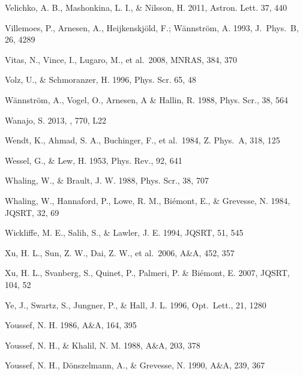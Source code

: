 \documentclass[traditabstract]{aa}
\begin{document}
\begin{thebibliography}{}
  Velichko, A. B., Mashonkina, L. I., \& Nilsson, H. 2011, Astron. Lett. 37, 440

  Villemoes, P., Arnesen, A., Heijkenskj\"old, F.; W\"annstr\"om, A. 1993, J.\ Phys.\ B, 26, 4289 

  Vitas, N., Vince, I., Lugaro, M., et al.\ 2008, MNRAS, 384, 370

  Volz, U., \& Schmoranzer, H.  1996, Phys. Scr.  65, 48

  W\"{a}nnstr\"{o}m, A., Vogel, O., Arnesen, A \& Hallin, R. 1988, Phys. Scr., 38, 564

  {Wanajo}, S. 2013, \apjl, 770, L22

  Wendt, K., Ahmad, S. A., Buchinger, F., et al.\ 1984, Z. Phys.\ A, 318, 125

  Wessel, G., \& Lew, H. 1953, Phys. Rev., 92, 641

  Whaling, W., \& Brault, J. W. 1988, Phys. Scr., 38, 707

  Whaling, W., Hannaford, P., Lowe, R. M., Bi\'emont, E., \& Grevesse, N. 1984, JQSRT, 32, 69

  Wickliffe, M. E., Salih, S., \& Lawler, J. E. 1994, JQSRT, 51, 545

  Xu, H. L., Sun, Z. W., Dai, Z. W., et al.\ 2006, A\&A, 452, 357

  Xu, H. L., Svanberg, S., Quinet, P., Palmeri, P. \& Bi\'emont, E. 2007, JQSRT, 104, 52

  Ye, J., Swartz, S., Jungner, P., \& Hall, J. L. 1996, Opt.\ Lett., 21, 1280

  Youssef, N. H. 1986, A\&A, 164, 395

  Youssef, N. H., \& Khalil, N. M. 1988, A\&A, 203, 378

  Youssef, N. H., D\"onszelmann, A., \& Grevesse, N. 1990, A\&A, 239, 367

\end{thebibliography}


\Online
\end{document}
